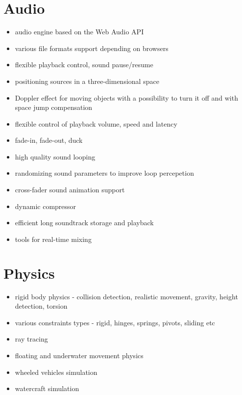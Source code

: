 \documentclass[a4paper,12pt,oneside]{sphinxmanual}
\begin{document}
\section{Audio}
\label{features:id11}\begin{itemize}
\item {} 
audio engine based on the Web Audio API

\item {} 
various file formats support depending on browsers

\item {} 
flexible playback control, sound pause/resume

\item {} 
positioning sources in a three-dimensional space

\item {} 
Doppler effect for moving objects with a possibility to turn it off and with space jump compensation

\item {} 
flexible control of playback volume, speed and latency

\item {} 
fade-in, fade-out, duck

\item {} 
high quality sound looping

\item {} 
randomizing sound parameters to improve loop percepetion

\item {} 
cross-fader sound animation support

\item {} 
dynamic compressor

\item {} 
efficient long soundtrack storage and playback

\item {} 
tools for real-time mixing

\end{itemize}


\section{Physics}
\label{features:id12}\begin{itemize}
\item {} 
rigid body physics - collision detection, realistic movement, gravity, height detection, torsion

\item {} 
various constraints types - rigid, hinges, springs, pivots, sliding etc

\item {} 
ray tracing

\item {} 
floating and underwater movement physics

\item {} 
wheeled vehicles simulation

\item {} 
watercraft simulation

\end{itemize}
\end{document}
